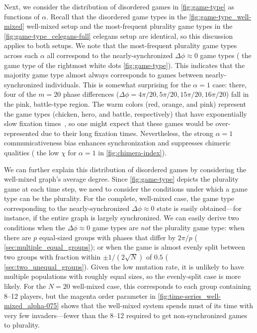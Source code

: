 \documentclass[pdflatex,twocolumn,sn-nature,super]{sn-jnl}
\begin{document}
Next, we consider the distribution of disordered games
in \cref{fig:game-type} as functions of $\alpha$.
Recall that the disordered game types
in the \cref{fig:game-type_well-mixed}
well-mixed setup
and the most-frequent plurality game types in the \cref{fig:game-type_celegans-full}
\gls{celegans} setup
are identical,
so this discussion applies to both setups.
We note that the most-frequent plurality game types
across each $\alpha$ all correspond
to the nearly-synchronized $\Delta \phi \approx 0$ game types
(\ie{} the game type of the rightmost white dots \cref{fig:game-type}).
This indicates that the majority game type almost always
corresponds to games between nearly-synchronized individuals.
This is somewhat surprising for the $\alpha = 1$ case:
there, four of the $m = 20$ phase differences
($\Delta \phi = 4 \pi/20, 5 \pi/20, 15\pi/20, 16\pi/20$)
fall in the pink, battle-type region.
The warm colors (red, orange, and pink)
represent the game types (chicken, hero, and battle, respectively)
that have exponentially slow fixation times~\citep{antal2006fixation},
so one might expect that these games would be over-represented
due to their long fixation times.
Nevertheless, the strong $\alpha = 1$ communicativeness bias
enhances synchronization and suppresses
chimeric qualities
(\cf{} the low $\chi$ for $\alpha = 1$ in \cref{fig:chimera-index}).

We can further explain this distribution of disordered games
by considering the well-mixed graph's average degree.
Since \cref{fig:game-type} depicts the plurality game at each time step,
we need to consider the conditions under which a game type can be the plurality.
For the complete, well-mixed case, the game type corresponding
to the nearly-synchronized $\Delta \phi \approx 0$ state
is easily obtained---for instance, if the entire graph is largely synchronized.
We can easily derive two conditions when the $\Delta \phi \approx 0$ game types
are \emph{not} the plurality game type:
when there are $p$ equal-sized groups
with phases that differ by $2 \pi/p$ (\cf{} \cref{sec:multiple_equal_groups});
or when the game is almost evenly split between two groups
with fraction within $\pm 1/(2 \sqrt{N})$ of $0.5$
(\cf{} \cref{sec:two_unequal_groups}).
Given the low mutation rate, it is unlikely to have
multiple populations with roughly equal sizes,
so the evenly-split case is more likely.
For the $N = 20$ well-mixed case, this corresponds
to each group containing \numrange{8}{12} players,
but the magenta order parameter in \cref{fig:time-series_well-mixed_alpha-075}
shows that the well-mixed system spends must of its time
with very few invaders---fewer
than the \numrange{8}{12} required to get non-synchronized games to plurality.
\end{document}
